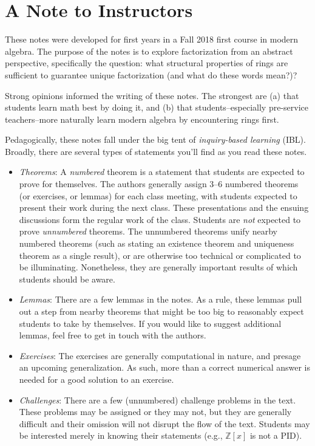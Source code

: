 \documentclass[english,course]{lecture}
\theoremstyle{plain}
\def\Z{{\mathbb Z}}
\begin{document}
\clearpage

\section*{A Note to Instructors}\label{Sec-NoteToInstructors}

These notes were developed for first years in a Fall 2018 first course in modern algebra. The purpose of the notes is to explore factorization from an abstract perspective, specifically the question: what structural properties of rings are sufficient to guarantee unique factorization (and what do these words mean?)?

Strong opinions informed the writing of these notes. The strongest are (a) that students learn math best by doing it, and (b) that students--especially pre-service teachers--more naturally learn modern algebra by encountering rings first.

Pedagogically, these notes fall under the big tent of \emph{inquiry-based learning} (IBL). Broadly, there are several types of statements you'll find as you read these notes.

\begin{itemize}
	\item \emph{Theorems}: A \emph{numbered} theorem is a statement that students are expected to prove for themselves. The authors generally assign 3--6 numbered theorems (or exercises, or lemmas) for each class meeting, with students expected to present their work during the next class. These presentations and the ensuing discussions form the regular work of the class. Students are \emph{not} expected to prove \emph{unnumbered} theorems. The unnumbered theorems unify nearby numbered theorems (such as stating an existence theorem and uniqueness theorem as a single result), or are otherwise too technical or complicated to be illuminating. Nonetheless, they are generally important results of which students should be aware.
	\item \emph{Lemmas}: There are a few lemmas in the notes. As a rule, these lemmas pull out a step from nearby theorems that might be too big to reasonably expect students to take by themselves. If you would like to suggest additional lemmas, feel free to get in touch with the authors.
	\item \emph{Exercises}: The exercises are generally computational in nature, and presage an upcoming generalization. As such, more than a correct numerical answer is needed for a good solution to an exercise.
	\item \emph{Challenges}: There are a few (unnumbered) challenge problems in the text. These problems may be assigned or they may not, but they are generally difficult and their omission will not disrupt the flow of the text. Students may be interested merely in knowing their statements (e.g., $\Z[x]$ is not a PID).
\end{itemize} 
\end{document}

